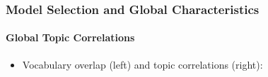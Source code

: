 \documentclass[xcolor=dvipsnames]{beamer}
\begin{document}
\begin{frame}
\frametitle{Model Selection and Global Characteristics}
\framesubtitle{Global Topic Correlations}
\begin{itemize}
\item Vocabulary overlap (left) and topic correlations (right):
\begin{figure}[h!]
\end{figure}		
\end{itemize}
\end{frame}
\end{document}

